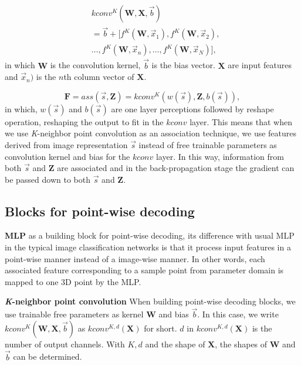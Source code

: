 \begin{equation}
\begin{aligned}
&kconv^{K}(\mathbf{W},\mathbf{X},\vec{b})\\
&=\vec{b}+[f^{K}(\mathbf{W},\vec{x}_1),f^{K}(\mathbf{W},\vec{x}_2),\\
&\dots,f^{K}(\mathbf{W},\vec{x}_n),\dots,f^{K}(\mathbf{W},\vec{x}_N)],
\end{aligned}
\end{equation}
in which $\mathbf{W}$ is the convolution kernel, $\vec{b}$ is the bias vector. $\mathbf{X}$ are input features and $\vec{x}_n)$ is the $n$th column vector of $\mathbf{X}$. 


\begin{equation}
\label{equ:K}
\mathbf{F}=ass(\vec{s},\mathbf{Z})=kconv^{K}(w(\vec{s}),\mathbf{Z},b(\vec{s})),
\end{equation}
in which, $w(\vec{s})$ and $b(\vec{s})$ are one layer perceptions followed by reshape operation, reshaping the output to fit in the $kconv$ layer. This means that when we use \emph{K}-neighbor point convolution as an association technique, we use features derived from image representation $\vec{s}$  instead of free trainable parameters as convolution kernel and bias for the $kconv$ layer. In this way, information from both $\vec{s}$ and $\mathbf{Z}$ are associated and in the back-propagation stage the gradient can be passed down to both $\vec{s}$ and $\mathbf{Z}$.
\subsection{Blocks for point-wise decoding}

\noindent\textbf{MLP} as a building block for point-wise decoding, its difference with usual MLP in the typical image classification networks is that it process input features in a point-wise manner instead of a image-wise manner. In other words, each associated feature corresponding to a sample point from parameter domain is mapped to one 3D point by the MLP.

\noindent\textbf{\emph{K}-neighbor point convolution}
When building point-wise decoding blocks, we use trainable free parameters as kernel $\mathbf{W}$ and bias $\vec{b}$. In this case, we write $kconv^{K}(\mathbf{W},\mathbf{X},\vec{b})$ as $kconv^{K,d}(\mathbf{X})$ for short. $d$ in $kconv^{K,d}(\mathbf{X})$ is the number of output channels. With $K,d$ and the shape of $\mathbf{X}$, the shapes of $\mathbf{W}$ and $\vec{b}$ can be determined.

